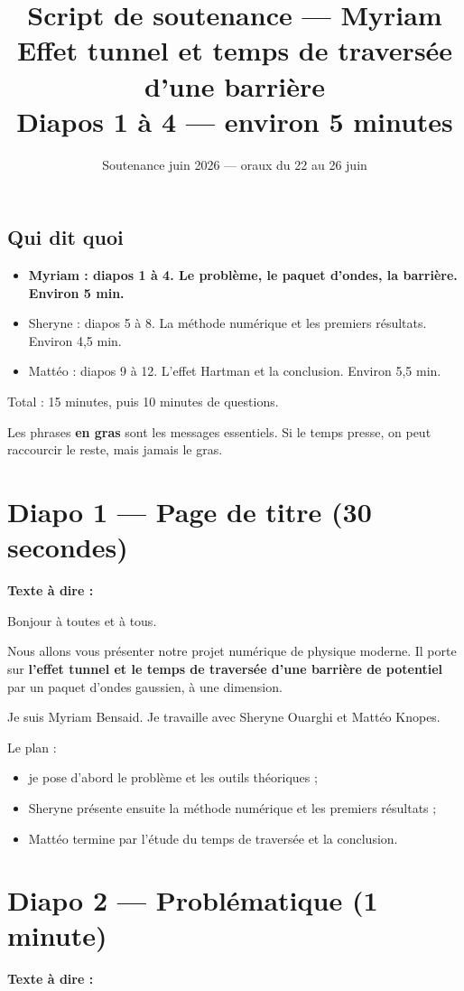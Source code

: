 \documentclass[12pt,a4paper]{article}
\title{\textbf{Script de soutenance --- Myriam}\\
\large Effet tunnel et temps de traversée d'une barrière\\
\normalsize Diapos 1 à 4 --- environ 5 minutes}
\author{}
\date{Soutenance juin 2026 --- oraux du 22 au 26 juin}
\newcommand{\diapo}[2]{\section*{Diapo #1 --- #2}}
\begin{document}
\maketitle

\subsection*{Qui dit quoi}

\begin{itemize}
\item \textbf{Myriam : diapos 1 à 4. Le problème, le paquet d'ondes, la barrière. Environ 5 min.}
\item Sheryne : diapos 5 à 8. La méthode numérique et les premiers résultats. Environ 4,5 min.
\item Mattéo : diapos 9 à 12. L'effet Hartman et la conclusion. Environ 5,5 min.
\end{itemize}

Total : 15 minutes, puis 10 minutes de questions.

Les phrases \textbf{en gras} sont les messages essentiels.
Si le temps presse, on peut raccourcir le reste, mais jamais le gras.

\clearpage
\diapo{1}{Page de titre (30 secondes)}

\textbf{Texte à dire :}

Bonjour à toutes et à tous.

Nous allons vous présenter notre projet numérique de physique moderne.
Il porte sur \textbf{l'effet tunnel et le temps de traversée
d'une barrière de potentiel} par un paquet d'ondes gaussien,
à une dimension.

Je suis Myriam Bensaid.
Je travaille avec Sheryne Ouarghi et Mattéo Knopes.

Le plan :

\begin{itemize}
\item je pose d'abord le problème et les outils théoriques ;
\item Sheryne présente ensuite la méthode numérique et les premiers résultats ;
\item Mattéo termine par l'étude du temps de traversée et la conclusion.
\end{itemize}

\clearpage
\diapo{2}{Problématique (1 minute)}

\textbf{Texte à dire :}
\end{document}
